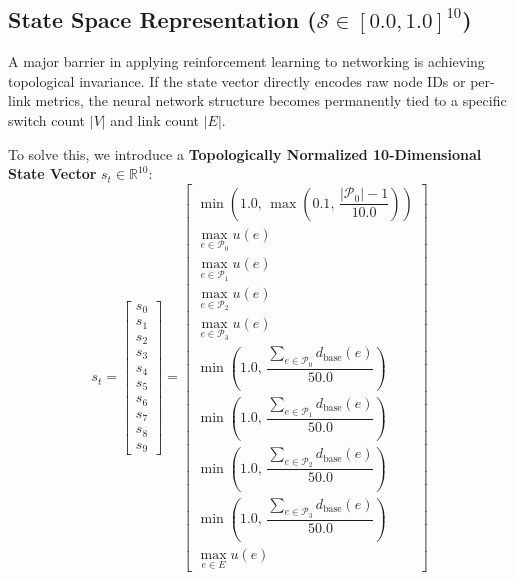 \subsection{State Space Representation ($\mathcal{S} \in [0.0, 1.0]^{10}$)}
A major barrier in applying reinforcement learning to networking is achieving topological invariance. If the state vector directly encodes raw node IDs or per-link metrics, the neural network structure becomes permanently tied to a specific switch count $|V|$ and link count $|E|$. 

To solve this, we introduce a \textbf{Topologically Normalized 10-Dimensional State Vector} $s_t \in \mathbb{R}^{10}$:
\begin{equation}
    s_t = \begin{bmatrix} 
        s_0 \\ s_1 \\ s_2 \\ s_3 \\ s_4 \\ s_5 \\ s_6 \\ s_7 \\ s_8 \\ s_9 
    \end{bmatrix} = \begin{bmatrix}
        \min\left(1.0, \, \max\left(0.1, \, \dfrac{|\mathcal{P}_0| - 1}{10.0}\right)\right) \\[0.5em]
        \max_{e \in \mathcal{P}_0} u(e) \\[0.5em]
        \max_{e \in \mathcal{P}_1} u(e) \\[0.5em]
        \max_{e \in \mathcal{P}_2} u(e) \\[0.5em]
        \max_{e \in \mathcal{P}_3} u(e) \\[0.5em]
        \min\left(1.0, \, \dfrac{\sum_{e \in \mathcal{P}_0} d_{\text{base}}(e)}{50.0}\right) \\[0.5em]
        \min\left(1.0, \, \dfrac{\sum_{e \in \mathcal{P}_1} d_{\text{base}}(e)}{50.0}\right) \\[0.5em]
        \min\left(1.0, \, \dfrac{\sum_{e \in \mathcal{P}_2} d_{\text{base}}(e)}{50.0}\right) \\[0.5em]
        \min\left(1.0, \, \dfrac{\sum_{e \in \mathcal{P}_3} d_{\text{base}}(e)}{50.0}\right) \\[0.5em]
        \max_{e \in E} u(e)
    \end{bmatrix}
    \label{eq:state_vector_full}
\end{equation}

